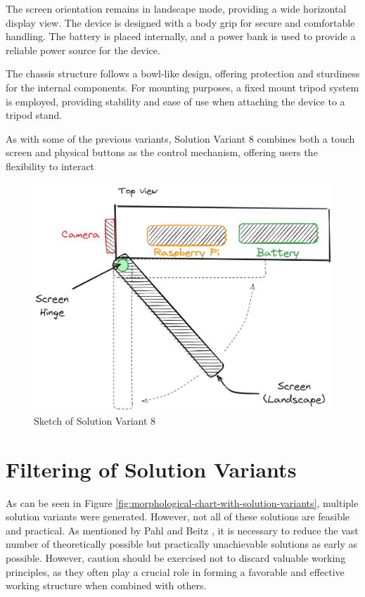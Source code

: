 The screen orientation remains in landscape mode, providing a wide horizontal display view. The device is designed with a body grip for secure and comfortable handling. The battery is placed internally, and a power bank is used to provide a reliable power source for the device.

The chassis structure follows a bowl-like design, offering protection and sturdiness for the internal components. For mounting purposes, a fixed mount tripod system is employed, providing stability and ease of use when attaching the device to a tripod stand.

As with some of the previous variants, Solution Variant 8 combines both a touch screen and physical buttons as the control mechanism, offering users the flexibility to interact

\begin{figure}[H]
    \centering
    \includegraphics[width=\linewidth]{texs/Part1/chapter3/image/v8.png}
    \caption{Sketch of Solution Variant 8}
    \label{fig:sketch-solution-variant-8}
\end{figure}

\section{Filtering of Solution Variants}
As can be seen in Figure \ref{fig:morphological-chart-with-solution-variants}, multiple solution variants were generated. However, not all of these solutions are feasible and practical. As mentioned by Pahl and Beitz \cite{Pahl07s}, it is necessary to reduce the vast number of theoretically possible but practically unachievable solutions as early as possible. However, caution should be exercised not to discard valuable working principles, as they often play a crucial role in forming a favorable and effective working structure when combined with others.

